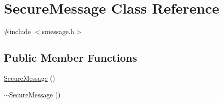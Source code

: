 \hypertarget{class_secure_message}{}\section{Secure\+Message Class Reference}
\label{class_secure_message}


{\ttfamily \#include $<$smessage.\+h$>$}

\subsection*{Public Member Functions}
\begin{DoxyCompactItemize}
\item 
\hyperlink{class_secure_message_a6bcfce50d98c362802f731acb0ef1020}{Secure\+Message} ()
\item 
\hyperlink{class_secure_message_ab1edd17883e0807d40601077c6c83a40}{$\sim$\+Secure\+Message} ()
\end{DoxyCompactItemize}
